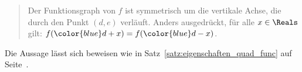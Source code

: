 \documentclass[12pt]{article}
\begin{document}
\begin{solution}[ex:symmetrieachse]
\begin{quotation}
Der Funktionsgraph von $f$ ist symmetrisch um die vertikale Achse, die durch den Punkt {\color{blue} $(d,e)$} verläuft. Anders ausgedrückt, für alle $x \in \Reals$ gilt: $f( {\color{blue} d+x}) = f( {\color{blue} d-x})$.
\end{quotation}

Die Aussage lässt sich beweisen wie in Satz~\ref{satz:eigenschaften_quad_func} auf Seite~\pageref{satz:eigenschaften_quad_func}.
\end{solution}
\end{document}
